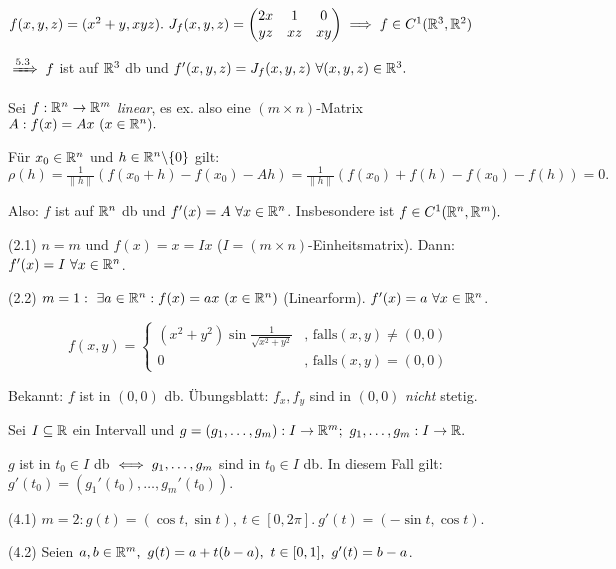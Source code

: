 \documentclass[a4paper,oneside,DIV15,BCOR12mm,chapterprefix=true,headings=onelinechapter]{scrbook}
\begin{document}
\begin{beispiele}
\item $f(x,y,z) = (x^2+y, xyz).\ J_f(x,y,z) = \begin{pmatrix}
2x & 1 & 0\\
yz & xz & xy\end{pmatrix} \implies f \in C^1(\mathbb{R}^3,\mathbb{R}^2)$

$\folgtnach{5.3} f$ ist auf $\mathbb{R}^3$ db und $f'(x,y,z) = J_f(x,y,z)\ \forall (x,y,z) \in \mathbb{R}^3.$

\item Sei $f:\mathbb{R}^n \to \mathbb{R}^m$ \emph{linear}, es ex. also eine $(m \times n)$-Matrix $A:f(x) = Ax\ (x \in \mathbb{R}^n).$

Für $x_0 \in \mathbb{R}^n$ und $h \in \mathbb{R}^n \backslash\{0\}$ gilt:\\
$\rho(h) = \frac{1}{\|h\|}(f(x_0+h) - f(x_0) - Ah) = \frac{1}{\|h\|}(f(x_0) + f(h) - f(x_0) - f(h)) = 0.$

Also: $f$ ist auf $\mathbb{R}^n$ db und $f'(x) = A\ \forall x \in \mathbb{R}^n$. Insbesondere ist $f \in C^1(\mathbb{R}^n,\mathbb{R}^m).$

\item[(2.1)] $n = m$ und $f(x) = x = Ix$ ($I = (m \times n)$-Einheitsmatrix). Dann: $f'(x) = I\ \forall x \in \mathbb{R}^n$.

\item[(2.2)] $m = 1:\ \exists a \in \mathbb{R}^n: f(x) = ax\ (x \in \mathbb{R}^n)$ (Linearform). $f'(x) = a\ \forall x \in \mathbb{R}^n$.

\item $$f(x,y) = \begin{cases}
(x^2+y^2) \sin \frac{1}{\sqrt{x^2+y^2}} & \text{, falls} (x,y) \ne (0,0)\\
0 & \text{, falls} (x,y) = (0,0)\end{cases}$$

Bekannt: $f$ ist in $(0,0)$ db. Übungsblatt: $f_x,f_y$ sind in $(0,0)$ \emph{nicht} stetig.

\item Sei $I \subseteq \mathbb{R}$ ein Intervall und $g = (g_1,\ldots,g_m): I \to \MdR^m;\ g_1,\ldots,g_m: I \to \MdR.$

$g$ ist in $t_0 \in I$ db $\iff g_1,\ldots,g_m$ sind in $t_0 \in I$ db. In diesem Fall gilt: $g'(t_0) = (g_1'(t_0),\ldots,g_m'(t_0)).$

\item[(4.1)] $m = 2: g(t) = (\cos t,\sin t),\ t \in [0,2\pi].\ g'(t) = (-\sin t,\cos t).$
\item[(4.2)] Seien $a,b \in \MdR^m,\ g(t) = a+t(b-a),\ t \in [0,1],\ g'(t) = b-a$.
\end{beispiele}
\end{document}
